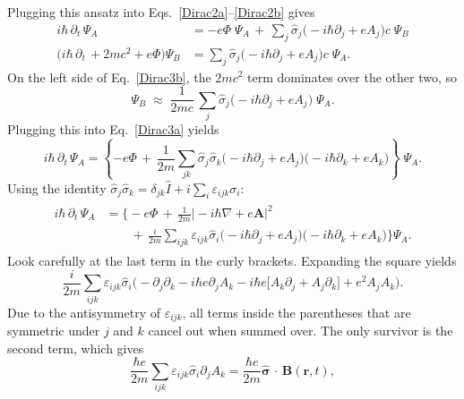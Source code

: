 \documentclass[pra,12pt]{revtex4}
\begin{document}
Plugging this ansatz into Eqs.~\eqref{Dirac2a}--\eqref{Dirac2b} gives
\begin{align}
  i\hbar\, \partial_t \, \Psi_A
  &= -e\Phi\; \Psi_A
  \,+\, \sum_{j} \hat{\sigma}_j \big(-i\hbar\partial_j
    +eA_j \big) c\;\Psi_B \label{Dirac3a} \\
  \big(i\hbar\, \partial_t \, + 2mc^2 + e\Phi\big)
  \Psi_B
  &= \sum_{j} \hat{\sigma}_j \big(-i\hbar\partial_j
    +eA_j \big) c\;\Psi_A. \label{Dirac3b}
\end{align}
On the left side of Eq.~\eqref{Dirac3b}, the $2mc^2$ term dominates
over the other two, so
\begin{equation}
  \Psi_B \;\approx\; \frac{1}{2mc}\, \sum_{j}
  \hat{\sigma}_j \big(-i\hbar\partial_j +eA_j \big) \;\Psi_A.
\end{equation}
Plugging this into Eq.~\eqref{Dirac3a} yields
\begin{equation}
  i\hbar\, \partial_t \, \Psi_A
  = \left\{-e\Phi \,+\, \frac{1}{2m} \sum_{jk} \hat{\sigma}_j \hat{\sigma}_k
  \big(-i\hbar\partial_j +eA_j \big)
  \big(-i\hbar\partial_k +eA_k \big) \right\}\;\Psi_A.
\end{equation}
Using the identity $\hat{\sigma}_j\hat{\sigma}_k = \delta_{jk}\hat{I}
+ i \sum_i \varepsilon_{ijk}\sigma_i$:
\begin{align}
  \begin{aligned}
  i\hbar\, \partial_t \, \Psi_A
  &= \Bigg\{-e\Phi
  \,+\, \frac{1}{2m} \big|-i\hbar\nabla +e\mathbf{A} \big|^2 \\
  &\qquad+\, \frac{i}{2m} \sum_{ijk} \varepsilon_{ijk} \hat{\sigma}_i
  \big(-i\hbar\partial_j +eA_j \big)
  \big(-i\hbar\partial_k +eA_k \big)
  \Bigg\} \Psi_A.
  \end{aligned}
\end{align}
Look carefully at the last term in the curly brackets.  Expanding the
square yields
\begin{equation*}
  \frac{i}{2m}\sum_{ijk}\varepsilon_{ijk}\hat{\sigma}_i
  \Big(-\partial_j\partial_k -i\hbar e \partial_jA_k
  - i\hbar e \big[A_k\partial_j + A_j\partial_k \big]
  + e^2A_jA_k \Big).
\end{equation*}
Due to the antisymmetry of $\varepsilon_{ijk}$, all terms inside the
parentheses that are symmetric under $j$ and $k$ cancel out when
summed over.  The only survivor is the second term, which gives
\begin{equation}
  \frac{\hbar e}{2m}\sum_{ijk}\varepsilon_{ijk}\hat{\sigma}_i
  \partial_jA_k = \frac{\hbar e}{2m} \hat{\boldsymbol{\sigma}}
  \,\cdot\, \mathbf{B}(\mathbf{r},t),
\end{equation}
\end{document}
